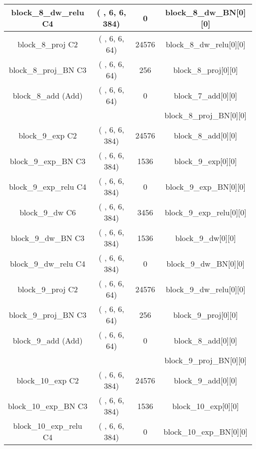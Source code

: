 \documentclass{bmvc2k}
\begin{document}
\begin{table}
\centering
\begin{tabular}{|c|c|c|c|}
block\_8\_dw\_relu C4   & ( , 6, 6, 384)  &  0      &     block\_8\_dw\_BN[0][0]       \\ \hline
block\_8\_proj C2        & ( , 6, 6, 64)   &  24576  &     block\_8\_dw\_relu[0][0]     \\ \hline
block\_8\_proj\_BN C3 & ( , 6, 6, 64)   &  256    &     block\_8\_proj[0][0]            \\ \hline
block\_8\_add (Add)               & ( , 6, 6, 64)   &  0      &     block\_7\_add[0][0]                \\ 
                                &                    &         &      block\_8\_proj\_BN[0][0]         \\ \hline
block\_9\_exp C2         & ( , 6, 6, 384)  &  24576  &     block\_8\_add[0][0]                \\ \hline
block\_9\_exp\_BN C3 & ( , 6, 6, 384)  &  1536   &     block\_9\_exp[0][0]             \\ \hline
block\_9\_exp\_relu C4      & ( , 6, 6, 384)  &  0      &     block\_9\_exp\_BN[0][0]          \\ \hline
block\_9\_dw C6 & ( , 6, 6, 384)  &  3456   &     block\_9\_exp\_relu[0][0]        \\ \hline
block\_9\_dw\_BN C3 & ( , 6, 6, 384)  &  1536   &     block\_9\_dw[0][0]          \\ \hline
block\_9\_dw\_relu C4   & ( , 6, 6, 384)  &  0      &     block\_9\_dw\_BN[0][0]       \\ \hline
block\_9\_proj C2        & ( , 6, 6, 64)   &  24576  &     block\_9\_dw\_relu[0][0]     \\ \hline
block\_9\_proj\_BN C3 & ( , 6, 6, 64)   &  256    &     block\_9\_proj[0][0]            \\ \hline
block\_9\_add (Add)               & ( , 6, 6, 64)   &  0      &     block\_8\_add[0][0]                \\ 
                                &                    &         &      block\_9\_proj\_BN[0][0]         \\ \hline
block\_10\_exp C2        & ( , 6, 6, 384)  &  24576  &     block\_9\_add[0][0]                \\ \hline
block\_10\_exp\_BN C3 & ( , 6, 6, 384)  &  1536   &     block\_10\_exp[0][0]            \\ \hline
block\_10\_exp\_relu C4     & ( , 6, 6, 384)  &  0      &     block\_10\_exp\_BN[0][0]         \\ \hline

\end{tabular}
\end{table}
\end{document}
